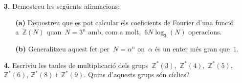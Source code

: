 \documentclass[a4paper]{article}
\theoremstyle{plain}
\theoremstyle{definition}
\newcommand{\ZZ}{\mathbb{Z}}
\begin{document}
\begin{enumerate}
    \item[\textbf{3.}] Demostreu les següents afirmacions:
        \begin{enumerate}
            \item[\textbf{(a)}] Demostreu que es pot calcular els coeficients de
                Fourier d'una funció a~\(\ZZ(N)\) quan~\(N=3^{n}\) amb, com a
                molt,~\(6N\log_{3}(N)\) operacions.
        \end{enumerate}
\end{enumerate}

\begin{enumerate}
    \item[]\begin{enumerate}
        \item[\textbf{(b)}] Generalitzeu aquest fet per~\(N=\alpha^{n}\)
            on~\(\alpha\) és un enter més gran que~\(1\).
    \end{enumerate}
\end{enumerate}

\begin{enumerate}
    \item[\textbf{4.}] Escriviu les taules de multiplicació dels
        grups~\(\ZZ^{\ast}(3)\),~\(\ZZ^{\ast}(4)\),~\(\ZZ^{\ast}(5)\),~\(\ZZ^{\ast}(6)\),
        \(\ZZ^{\ast}(8)\) i~\(\ZZ^{\ast}(9)\).
        Quins d'aquests grups són cíclics?
\end{enumerate}
\end{document}
